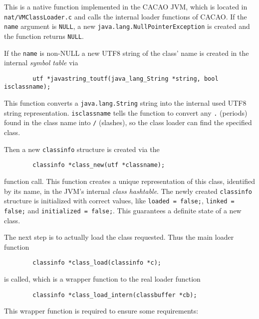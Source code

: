 \begingroup
{}
This is a native function implemented in the CACAO JVM, which is
located in \texttt{nat/VMClassLoader.c} and calls the internal loader
functions of CACAO. If the \texttt{name} argument is \texttt{NULL}, a
new \texttt{java.lang.NullPointerException} is created and the
function returns \texttt{NULL}.

\endgroup

If the \texttt{name} is non-NULL a new UTF8 string of the class' name
is created in the internal \textit{symbol table} via

\begin{verbatim}
        utf *javastring_toutf(java_lang_String *string, bool isclassname);
\end{verbatim}

This function converts a \texttt{java.lang.String} string into the
internal used UTF8 string representation. \texttt{isclassname} tells
the function to convert any \texttt{.} (periods) found in the class
name into \texttt{/} (slashes), so the class loader can find the
specified class.

Then a new \texttt{classinfo} structure is created via the

\begin{verbatim}
        classinfo *class_new(utf *classname);
\end{verbatim}

function call. This function creates a unique representation of this
class, identified by its name, in the JVM's internal \textit{class
hashtable}. The newly created \texttt{classinfo} structure is
initialized with correct values, like \texttt{loaded = false;},
\texttt{linked = false;} and \texttt{initialized = false;}. This
guarantees a definite state of a new class.

The next step is to actually load the class requested. Thus the main
loader function

\begin{verbatim}
        classinfo *class_load(classinfo *c);
\end{verbatim}

is called, which is a wrapper function to the real loader function

\begin{verbatim}
        classinfo *class_load_intern(classbuffer *cb);
\end{verbatim}

This wrapper function is required to ensure some requirements:

